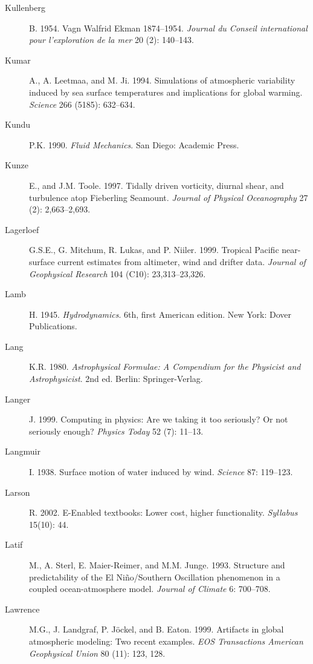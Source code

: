 \begin{description}
\item [Kullenberg]B. 1954. Vagn Walfrid Ekman 1874--1954. \textit{Journal du Conseil international pour l'exploration de la mer} 20 (2): 140--143.

\item [Kumar]A., A. Leetmaa, and M. Ji. 1994. Simulations of atmospheric
variability induced by sea surface temperatures and implications for global
warming. \textit{Science} 266 (5185): 632--634.

\item [Kundu]P.K. 1990. \textit{Fluid Mechanics}. San Diego: Academic Press.

\item [Kunze]E., and J.M. Toole. 1997. Tidally driven vorticity, diurnal shear,
and turbulence atop Fieberling Seamount. \textit{Journal of Physical
Oceanography} 27 (2): 2,663--2,693.

\item [Lagerloef]G.S.E., G. Mitchum, R. Lukas, and P. Niiler. 1999. Tropical
Pacific near-surface current estimates from altimeter, wind and drifter data.
\textit{Journal of Geophysical Research} 104 (C10): 23,313--23,326.

\item [Lamb]H. 1945. \textit{Hydrodynamics}. 6th, first American edition. New
York: Dover Publications.

\item [Lang]K.R. 1980. \textit{Astrophysical Formulae: A Compendium for the
Physicist and Astrophysicist}. 2nd ed.  Berlin: Springer-Verlag.

\item [Langer]J. 1999. Computing in physics: Are we taking it too seriously? Or
not seriously enough? \textit{Physics Today} 52 (7): 11--13.

\item [Langmuir]I. 1938. Surface motion of water induced by wind. \textit{Science}
87: 119--123.

\item [Larson]R. 2002. E-Enabled textbooks: Lower cost, higher
functionality. \textit{Syllabus} 15(10): 44.

\item [Latif]M., A. Sterl, E. Maier-Reimer, and M.M. Junge.
1993. Structure and predictability of the El Ni\~{n}o/Southern Oscillation
phenomenon in a coupled ocean-atmosphere model. \textit{Journal of Climate} 6:
700--708.

\item [Lawrence]M.G., J. Landgraf, P. Jöckel, and B. Eaton. 1999. Artifacts in
global atmospheric modeling: Two recent examples. \textit{EOS Transactions
American Geophysical Union} 80 (11): 123, 128.


\end{description}
